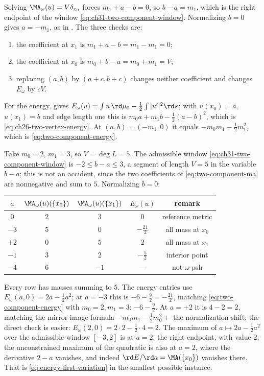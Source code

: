 Solving \(\MA_\omega(u)=V\delta_{x_0}\) forces \(m_1+a-b=0\), so
\(b-a=m_1\), which is the right endpoint of the window
\eqref{eq:ch31-two-component-window}.  Normalizing \(b=0\) gives
\(a=-m_1\), as in .  The three checks are:
\begin{enumerate}
\item the coefficient at \(x_1\) is \(m_1+a-b=m_1-m_1=0\);
\item the coefficient at \(x_0\) is \(m_0+b-a=m_0+m_1=V\);
\item replacing \((a,b)\) by \((a+c,b+c)\) changes neither coefficient and
 changes \(E_\omega\) by \(cV\).
\end{enumerate}
For the energy,  gives
\(E_\omega(u)=\int u\,\rd\mu_0-\tfrac12\int|u'|^2\rd s\); with
\(u(x_0)=a\), \(u(x_1)=b\) and edge length one this is
\(m_0a+m_1b-\tfrac12(a-b)^2\), which is
\eqref{eq:ch26-two-vertex-energy}.  At \((a,b)=(-m_1,0)\) it equals
\(-m_0m_1-\tfrac12m_1^2\), which is \eqref{eq:two-component-energy}.

\begin{example}
\label{ex:ch31-two-component-numbers}
Take \(m_0=2\), \(m_1=3\), so \(V=\deg L=5\).  The admissible window
\eqref{eq:ch31-two-component-window} is \(-2\leq b-a\leq3\), a segment of
length \(V=5\) in the variable \(b-a\); this is not an accident, since the
two coefficients of \eqref{eq:two-component-ma} are nonnegative and sum to
\(5\).  Normalizing \(b=0\):
\begin{center}
\small
\begin{tabular}{c|c|c|c|c}
\toprule
\(a\)&\(\MA_\omega(u)(\{x_0\})\)&\(\MA_\omega(u)(\{x_1\})\)
 &\(E_\omega(u)\)&remark\\
\midrule
\(0\)&\(2\)&\(3\)&\(0\)&reference metric\\
\(-3\)&\(5\)&\(0\)&\(-\tfrac{21}2\)&all mass at \(x_0\)\\
\(+2\)&\(0\)&\(5\)&\(2\)&all mass at \(x_1\)\\
\(-1\)&\(3\)&\(2\)&\(-\tfrac52\)&interior point\\
\(-4\)&\(6\)&\(-1\)&---&not \(\omega\)-psh\\
\bottomrule
\end{tabular}
\end{center}
Every row has masses summing to \(5\).  The energy entries use
\(E_\omega(a,0)=2a-\tfrac12a^2\); at \(a=-3\) this is
\(-6-\tfrac92=-\tfrac{21}2\), matching \eqref{eq:two-component-energy} with
\(m_0=2,m_1=3\): \(-6-\tfrac92\).  At \(a=+2\) it is \(4-2=2\), matching the
mirror-image formula \(-m_0m_1-\tfrac12m_0^2+\) the normalization shift; the
direct check is easier: \(E_\omega(2,0)=2\cdot2-\tfrac12\cdot4=2\).  The
maximum of \(a\mapsto2a-\tfrac12a^2\) over the admissible window
\([-3,2]\) is at \(a=2\), the right endpoint, with value \(2\); the
unconstrained maximum of the quadratic is also at \(a=2\), where the
derivative \(2-a\) vanishes, and indeed \(\rd E/\rd a=\MA(\{x_0\})\)
vanishes there.  That is
\eqref{eq:energy-first-variation} in the smallest possible instance.
\end{example}

